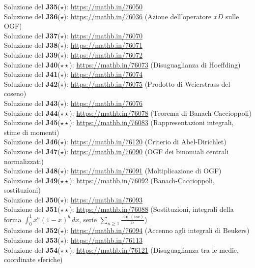 \documentclass[a4paper,twoside]{article}
\theoremstyle{definition}
\numberwithin{theorem}{section}
\begin{document}
Soluzione del \textbf{J35}($\star$): \url{https://mathb.in/76050} \\
Soluzione del \textbf{J36}($\star$): \url{https://mathb.in/76036} (Azione dell'operatore $xD$ sulle OGF)\\
Soluzione del \textbf{J37}($\star$): \url{https://mathb.in/76070}\\
Soluzione del \textbf{J38}($\star$): \url{https://mathb.in/76071}\\
Soluzione del \textbf{J39}($\star$): \url{https://mathb.in/76072}\\
Soluzione del \textbf{J40}($\star\star$): \url{https://mathb.in/76073} (Disuguaglianza di Hoeffding)\\
Soluzione del \textbf{J41}($\star$): \url{https://mathb.in/76074}\\
Soluzione del \textbf{J42}($\star$): \url{https://mathb.in/76075} (Prodotto di Weierstrass del coseno)\\
Soluzione del \textbf{J43}($\star$): \url{https://mathb.in/76076}\\
Soluzione del \textbf{J44}($\star\star$): \url{https://mathb.in/76078} (Teorema di Banach-Caccioppoli)\\
Soluzione del \textbf{J45}($\star\star$): \url{https://mathb.in/76083} (Rappresentazioni integrali, stime di momenti)\\
Soluzione del \textbf{J46}($\star$): \url{https://mathb.in/76120} (Criterio di Abel-Dirichlet)\\
Soluzione del \textbf{J47}($\star$): \url{https://mathb.in/76090} (OGF dei binomiali centrali normalizzati)\\
Soluzione del \textbf{J48}($\star$): \url{https://mathb.in/76091} (Moltiplicazione di OGF)\\
Soluzione del \textbf{J49}($\star\star$): \url{https://mathb.in/76092} (Banach-Caccioppoli, sostituzioni) \\
Soluzione del \textbf{J50}($\star$): \url{https://mathb.in/76093} \\
Soluzione del \textbf{J51}($\star\star$): \url{https://mathb.in/76088} (Sostituzioni, integrali della forma $\int_{0}^{1}x^a(1-x)^b\,dx$, serie $\sum_{n\geq 1}\frac{\sin(nx)}{n}$)\\
Soluzione del \textbf{J52}($\star$): \url{https://mathb.in/76094} (Accenno agli integrali di Beukers)\\
Soluzione del \textbf{J53}($\star$): \url{https://mathb.in/76113} \\
Soluzione del \textbf{J54}($\star\star$): \url{https://mathb.in/76121} (Disuguaglianza tra le medie, coordinate sferiche)\\
\end{document}
